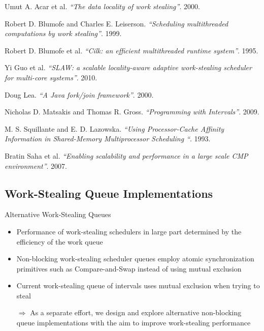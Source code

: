 \begin{frame}
  \begin{thebibliography}{10}
    \beamertemplatearticlebibitems

   Umut A. Acar et al. {\em``The data locality
      of work stealing''}. 2000.

   Robert D. Blumofe and Charles
    E. Leiserson. {\em``Scheduling multithreaded computations by work
      stealing''}. 1999.

   Robert D. Blumofe et al. {\em``Cilk: an efficient
      multithreaded runtime system''}. 1995.

   Yi Guo et al. {\em``SLAW: a scalable locality-aware
      adaptive work-stealing scheduler for multi-core
      systems''}. 2010.

   Doug Lea. {\em``A Java fork/join
      framework''}. 2000.

   Nicholas D. Matsakis and Thomas
    R. Gross. {\em``Programming with Intervals''}. 2009.

   M. S. Squillante and
    E. D. Lazowska. {\em``Using Processor-Cache Affinity Information
      in Shared-Memory Multiprocessor Scheduling ``}. 1993.

   Bratin Saha et al. {\em``Enabling scalability and
      performance in a large scale CMP environment''}. 2007.

  \end{thebibliography}
\end{frame}



\subsection{Work-Stealing Queue Implementations}

\begin{frame}{Alternative Work-Stealing Queues}
  \begin{itemize}
  \item Performance of work-stealing schedulers in large part
    determined by the efficiency of the work queue
  \item Non-blocking work-stealing scheduler queues employ atomic
    synchronization primitives such as Compare-and-Swap instead of
    using mutual exclusion
  \item Current work-stealing queue of intervals uses mutual exclusion
    when trying to steal
  \end{itemize}


  \begin{itemize}
  \item[$\Rightarrow$] As a separate effort, we design and explore
    alternative non-blocking queue implementations with the aim to
    improve work-stealing performance
  \end{itemize}
\end{frame}

